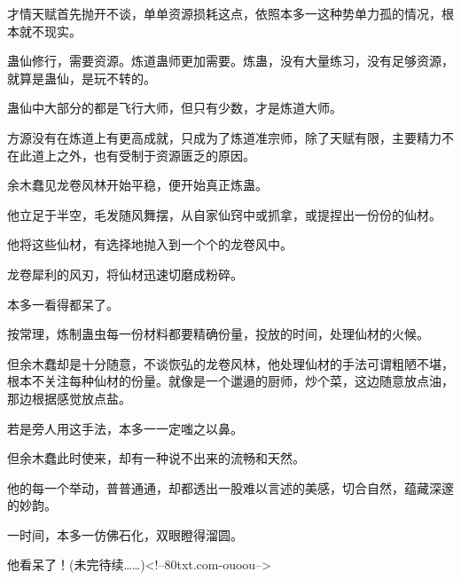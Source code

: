 \begin{this_body}
才情天赋首先抛开不谈，单单资源损耗这点，依照本多一这种势单力孤的情况，根本就不现实。

蛊仙修行，需要资源。炼道蛊师更加需要。炼蛊，没有大量练习，没有足够资源，就算是蛊仙，是玩不转的。

蛊仙中大部分的都是飞行大师，但只有少数，才是炼道大师。

方源没有在炼道上有更高成就，只成为了炼道准宗师，除了天赋有限，主要精力不在此道上之外，也有受制于资源匮乏的原因。

余木蠢见龙卷风林开始平稳，便开始真正炼蛊。

他立足于半空，毛发随风舞摆，从自家仙窍中或抓拿，或提捏出一份份的仙材。

他将这些仙材，有选择地抛入到一个个的龙卷风中。

龙卷犀利的风刃，将仙材迅速切磨成粉碎。

本多一看得都呆了。

按常理，炼制蛊虫每一份材料都要精确份量，投放的时间，处理仙材的火候。

但余木蠢却是十分随意，不谈恢弘的龙卷风林，他处理仙材的手法可谓粗陋不堪，根本不关注每种仙材的份量。就像是一个邋遢的厨师，炒个菜，这边随意放点油，那边根据感觉放点盐。

若是旁人用这手法，本多一一定嗤之以鼻。

但余木蠢此时使来，却有一种说不出来的流畅和天然。

他的每一个举动，普普通通，却都透出一股难以言述的美感，切合自然，蕴藏深邃的妙韵。

一时间，本多一仿佛石化，双眼瞪得溜圆。

他看呆了！(未完待续……)<!--80txt.com-ouoou-->

\end{this_body}

